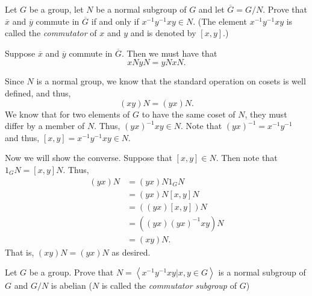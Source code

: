 \documentclass[12 pt, letterpaper]{hmcpset}
\begin{document}
\begin{problem}
	Let $G$ be a group, let $N$ be a normal subgroup of $G$ and let $\overline{G} = G/N$. Prove that $\overline{x}$ and $\overline{y}$ commute in $\overline{G}$ if and only if $x^{-1}y^{-1}xy \in N$. (The element $x^{-1}y^{-1}xy$ is called the \textit{commutator} of $x$ and $y$ and is denoted by $[x, y]$.)
\end{problem}

\begin{solution}
	Suppose $\overline{x}$ and $\overline{y}$ commute in $\overline{G}$. Then we must have that
	\[
		x N y N = y N x N.
	\] 

	Since $N$ is a normal group, we know that the standard operation on cosets is well defined, and thus,
	\[
		(xy) N = (yx) N.
	\]
	We know that for two elements of $G$ to have the same coset of $N$, they must differ by a member of $N$. Thus, $(yx)^{-1}xy \in N$. Note that $(yx)^{-1} = x^{-1} y^{-1}$ and thus, $[x, y] = x^{-1}y^{-1}xy \in N$. 

	Now we will show the converse. Suppose that $[x, y] \in N$. Then note that $1_{G} N = [x, y] N$. Thus,
	\[
		\begin{split}
			(yx) N & = (yx) N 1_{G} N \\
			       & = (yx) N [x, y] N \\
			       & = ((yx)[x, y]) N \\
			       & = ((yx)(yx)^{-1}xy) N \\
			       & = (xy) N.
		\end{split}
	\]
	That is, $(xy) N = (yx) N$ as desired.
\end{solution}

\pagebreak

\begin{problem}
	Let $G$ be a group. Prove that $N = \left < x^{-1}y^{-1}xy | x, y \in G \right >$ is a normal subgroup of $G$ and $G/N$ is abelian ($N$ is called the \textit{commutator subgroup} of $G$)
\end{problem}
\end{document}
